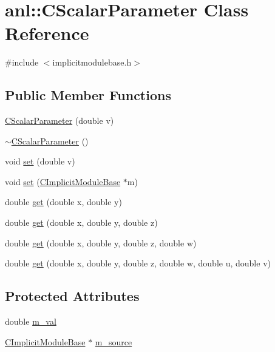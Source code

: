 \hypertarget{classanl_1_1CScalarParameter}{
\section{anl::CScalarParameter Class Reference}
\label{classanl_1_1CScalarParameter}
}


{\ttfamily \#include $<$implicitmodulebase.h$>$}\subsection*{Public Member Functions}
\begin{DoxyCompactItemize}
\item 
\hyperlink{classanl_1_1CScalarParameter_a566aa6d5ad62b5f70267fb98bc2945fb}{CScalarParameter} (double v)
\item 
\hyperlink{classanl_1_1CScalarParameter_ac01cbccdbc748f87cc63c9844912139e}{$\sim$CScalarParameter} ()
\item 
void \hyperlink{classanl_1_1CScalarParameter_af3c5d0abdd8e85b43a4ac42bae2ac1ab}{set} (double v)
\item 
void \hyperlink{classanl_1_1CScalarParameter_a615097c7cf0f57ba9e05f236bc134f25}{set} (\hyperlink{classanl_1_1CImplicitModuleBase}{CImplicitModuleBase} $\ast$m)
\item 
double \hyperlink{classanl_1_1CScalarParameter_af71bbcd788288e8b3f26940fd29262e0}{get} (double x, double y)
\item 
double \hyperlink{classanl_1_1CScalarParameter_a24b5825ba58b04cb806165ee719130e1}{get} (double x, double y, double z)
\item 
double \hyperlink{classanl_1_1CScalarParameter_a377e6dc6b39e1c44fddd5228dbe78ff0}{get} (double x, double y, double z, double w)
\item 
double \hyperlink{classanl_1_1CScalarParameter_a17ece21eccdeaebfd3ae1a153665959a}{get} (double x, double y, double z, double w, double u, double v)
\end{DoxyCompactItemize}
\subsection*{Protected Attributes}
\begin{DoxyCompactItemize}
\item 
double \hyperlink{classanl_1_1CScalarParameter_a6a61bde485c1ba665a60d44cb152cca3}{m\_\-val}
\item 
\hyperlink{classanl_1_1CImplicitModuleBase}{CImplicitModuleBase} $\ast$ \hyperlink{classanl_1_1CScalarParameter_ab87249eb99b6c1f7e548ed635db93e0e}{m\_\-source}
\end{DoxyCompactItemize}


